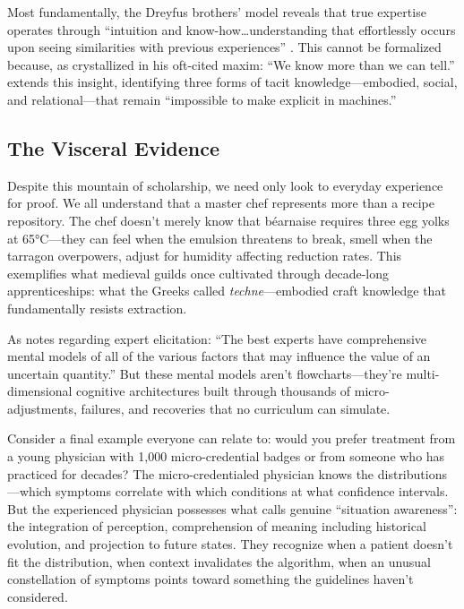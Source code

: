 Most fundamentally, the Dreyfus brothers' model reveals that true expertise operates through ``intuition and know-how\ldots understanding that effortlessly occurs upon seeing similarities with previous experiences'' \citep{pena2010}. This cannot be formalized because, as \citet{polanyi1966} crystallized in his oft-cited maxim: ``We know more than we can tell.'' \citet{collins2010} extends this insight, identifying three forms of tacit knowledge---embodied, social, and relational---that remain ``impossible to make explicit in machines.''

\subsection{The Visceral Evidence}

Despite this mountain of scholarship, we need only look to everyday experience for proof. We all understand that a master chef represents more than a recipe repository. The chef doesn't merely know that béarnaise requires three egg yolks at 65°C---they can feel when the emulsion threatens to break, smell when the tarragon overpowers, adjust for humidity affecting reduction rates. This exemplifies what medieval guilds once cultivated through decade-long apprenticeships: what the Greeks called \emph{techne}---embodied craft knowledge that fundamentally resists extraction.

As \citet{morgan2014} notes regarding expert elicitation: ``The best experts have comprehensive mental models of all of the various factors that may influence the value of an uncertain quantity.'' But these mental models aren't flowcharts---they're multi-dimensional cognitive architectures built through thousands of micro-adjustments, failures, and recoveries that no curriculum can simulate.

Consider a final example everyone can relate to: would you prefer treatment from a young physician with 1,000 micro-credential badges or from someone who has practiced for decades? The micro-credentialed physician knows the distributions---which symptoms correlate with which conditions at what confidence intervals. But the experienced physician possesses what \citet{endsley1995} calls genuine ``situation awareness'': the integration of perception, comprehension of meaning including historical evolution, and projection to future states. They recognize when a patient doesn't fit the distribution, when context invalidates the algorithm, when an unusual constellation of symptoms points toward something the guidelines haven't considered.

